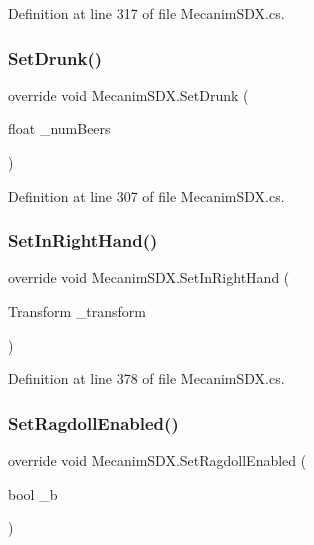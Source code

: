 Definition at line 317 of file Mecanim\+S\+D\+X.\+cs.

\mbox{\label{class_mecanim_s_d_x_a74c8b0551772d504e8a8c93bc01fb885}} 
\subsubsection{\texorpdfstring{SetDrunk()}{SetDrunk()}}
{\footnotesize\ttfamily override void Mecanim\+S\+D\+X.\+Set\+Drunk (\begin{DoxyParamCaption}\item[{float}]{\+\_\+num\+Beers }\end{DoxyParamCaption})}



Definition at line 307 of file Mecanim\+S\+D\+X.\+cs.

\mbox{\label{class_mecanim_s_d_x_a1f10e8667d155ce0230dac7160971664}} 
\subsubsection{\texorpdfstring{SetInRightHand()}{SetInRightHand()}}
{\footnotesize\ttfamily override void Mecanim\+S\+D\+X.\+Set\+In\+Right\+Hand (\begin{DoxyParamCaption}\item[{Transform}]{\+\_\+transform }\end{DoxyParamCaption})}



Definition at line 378 of file Mecanim\+S\+D\+X.\+cs.

\mbox{\label{class_mecanim_s_d_x_a1520d85f59b9e0cb8094befb872147ef}} 
\subsubsection{\texorpdfstring{SetRagdollEnabled()}{SetRagdollEnabled()}}
{\footnotesize\ttfamily override void Mecanim\+S\+D\+X.\+Set\+Ragdoll\+Enabled (\begin{DoxyParamCaption}\item[{bool}]{\+\_\+b }\end{DoxyParamCaption})}



